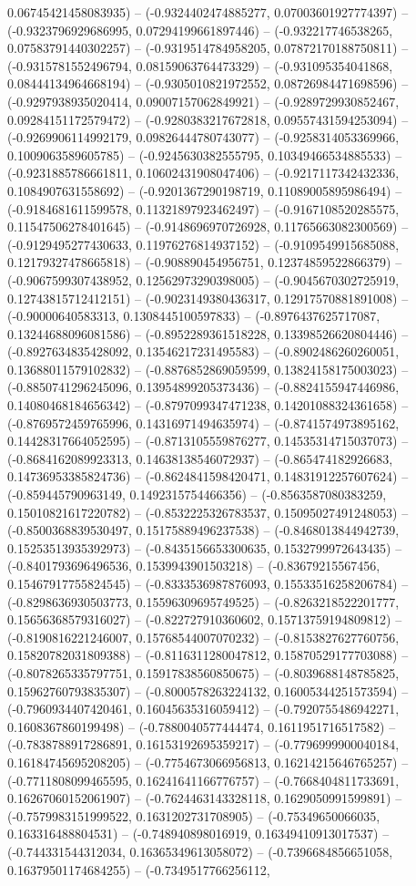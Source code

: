 0.06745421458083935) -- (-0.9324402474885277, 0.07003601927774397) -- (-0.9323796929686995, 0.07294199661897446) -- (-0.932217746538265, 0.07583791440302257) -- (-0.9319514784958205, 0.07872170188750811) -- (-0.9315781552496794, 0.08159063764473329) -- (-0.931095354041868, 0.08444134964668194) -- (-0.9305010821972552, 0.08726984471698596) -- (-0.9297938935020414, 0.09007157062849921) -- (-0.9289729930852467, 0.09284151172579472) -- (-0.9280383217672818, 0.09557431594253094) -- (-0.9269906114992179, 0.09826444780743077) -- (-0.9258314053369966, 0.1009063589605785) -- (-0.9245630382555795, 0.10349466534885533) -- (-0.9231885786661811, 0.10602431908047406) -- (-0.9217117342432336, 0.1084907631558692) -- (-0.9201367290198719, 0.11089005895986494) -- (-0.9184681611599578, 0.11321897923462497) -- (-0.9167108520285575, 0.11547506278401645) -- (-0.9148696970726928, 0.11765663082300569) -- (-0.9129495277430633, 0.11976276814937152) -- (-0.9109549915685088, 0.12179327478665818) -- (-0.908890454956751, 0.12374859522866379) -- (-0.9067599307438952, 0.12562973290398005) -- (-0.9045670302725919, 0.12743815712412151) -- (-0.9023149380436317, 0.12917570881891008) -- (-0.90000640583313, 0.1308445100597833) -- (-0.8976437625717087, 0.13244688096081586) -- (-0.8952289361518228, 0.13398526620804446) -- (-0.8927634835428092, 0.13546217231495583) -- (-0.8902486260260051, 0.13688011579102832) -- (-0.8876852869059599, 0.13824158175003023) -- (-0.8850741296245096, 0.13954899205373436) -- (-0.8824155947446986, 0.14080468184656342) -- (-0.8797099347471238, 0.14201088324361658) -- (-0.8769572459765996, 0.14316971494635974) -- (-0.8741574973895162, 0.14428317664052595) -- (-0.8713105559876277, 0.14535314715037073) -- (-0.8684162089923313, 0.14638138546072937) -- (-0.865474182926683, 0.14736953385824736) -- (-0.8624841598420471, 0.14831912257607624) -- (-0.859445790963149, 0.1492315754466356) -- (-0.8563587080383259, 0.15010821617220782) -- (-0.8532225326783537, 0.15095027491248053) -- (-0.8500368839530497, 0.15175889496237538) -- (-0.8468013844942739, 0.15253513935392973) -- (-0.8435156653300635, 0.1532799972643435) -- (-0.8401793696496536, 0.1539943901503218) -- (-0.83679215567456, 0.15467917755824545) -- (-0.8333536987876093, 0.15533516258206784) -- (-0.8298636930503773, 0.15596309695749525) -- (-0.8263218522201777, 0.15656368579316027) -- (-0.822727910360602, 0.15713759194809812) -- (-0.8190816221246007, 0.15768544007070232) -- (-0.8153827627760756, 0.15820782031809388) -- (-0.8116311280047812, 0.15870529177703088) -- (-0.8078265335797751, 0.15917838560850675) -- (-0.8039688148785825, 0.15962760793835307) -- (-0.8000578263224132, 0.16005344251573594) -- (-0.7960934407420461, 0.16045635316059412) -- (-0.7920755486942271, 0.1608367860199498) -- (-0.7880040577444474, 0.1611951716517582) -- (-0.7838788917286891, 0.16153192695359217) -- (-0.7796999900040184, 0.16184745695208205) -- (-0.7754673066956813, 0.16214215646765257) -- (-0.7711808099465595, 0.16241641166776757) -- (-0.7668404811733691, 0.16267060152061907) -- (-0.7624463143328118, 0.1629050991599891) -- (-0.7579983151999522, 0.1631202731708905) -- (-0.75349650066035, 0.163316488804531) -- (-0.748940898016919, 0.16349410913017537) -- (-0.744331544312034, 0.16365349613058072) -- (-0.7396684856651058, 0.16379501174684255) -- (-0.7349517766256112, 
